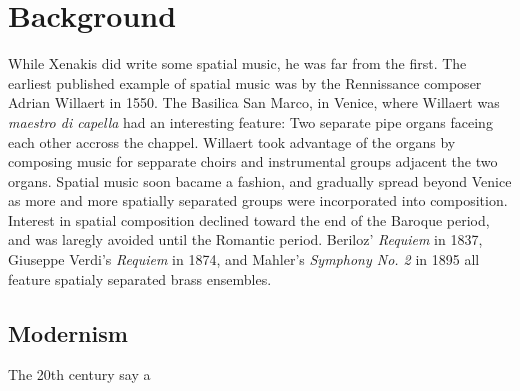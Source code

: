 \chapter{Background}
\label{ch:background}

While Xenakis did write some spatial music, he was far from the
first. The earliest published example of spatial music was by the
Rennissance composer Adrian Willaert in 1550.\cite{Zvonar1999c} The
Basilica San Marco, in Venice, where Willaert was \textit{maestro di
  capella} had an interesting feature: Two separate pipe organs
faceing each other accross the chappel. Willaert took advantage of the
organs by composing music for sepparate choirs and instrumental groups
adjacent the two organs. Spatial music soon bacame a fashion, and
gradually spread beyond Venice as more and more spatially separated
groups were incorporated into composition. Interest in spatial
composition declined toward the end of the Baroque period, and was
laregly avoided until the Romantic period. Beriloz' \textit{Requiem}
in 1837, Giuseppe Verdi's \textit{Requiem} in 1874, and Mahler's
\textit{Symphony No. 2} in 1895 all feature spatialy separated brass
ensembles.

\section{Modernism}
\label{sec:modernism}
The 20th century say a 



